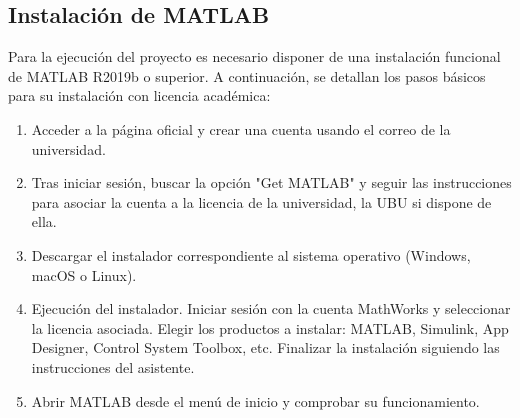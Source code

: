 \subsection{Instalación de MATLAB}
Para la ejecución del proyecto es necesario disponer de una instalación funcional de MATLAB R2019b o superior. A continuación, se detallan los pasos básicos para su instalación con licencia académica:
\begin{enumerate}
    \item Acceder a la página oficial \cite{mathworks_matlab} y crear una cuenta usando el correo de la universidad.
    \item Tras iniciar sesión, buscar la opción "Get MATLAB" y seguir las instrucciones para asociar la cuenta a la licencia de la universidad, la UBU si dispone de ella. 
    \item Descargar el instalador correspondiente al sistema operativo (Windows, macOS o Linux).
    \item Ejecución del instalador. Iniciar sesión con la cuenta MathWorks y seleccionar la licencia asociada. Elegir los productos a instalar: MATLAB, Simulink, App Designer, Control System Toolbox, etc. Finalizar la instalación siguiendo las instrucciones del asistente.
    \item Abrir MATLAB desde el menú de inicio y comprobar su funcionamiento.
\end{enumerate}

